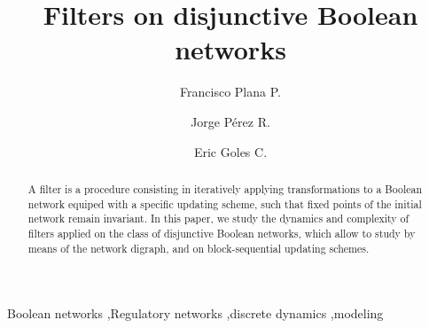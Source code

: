 \documentclass[preprint,12pt]{elsarticle}
\begin{document}
\begin{frontmatter}



\title{Filters on disjunctive Boolean networks}


\author{Francisco Plana P.}
\author[UCh]{Jorge Pérez R.}
\author[UAI]{Eric Goles C.}


\address[UAI]{Universidad Adolfo Ibáñez}
\address[UCh]{Universidad de Chile}

\begin{abstract}
A filter is a procedure consisting in iteratively applying transformations to a Boolean network equiped with a specific updating scheme, such that fixed points of the initial network remain invariant. In this paper, we study the dynamics and complexity of filters applied on the class of disjunctive Boolean networks, which allow to study by means of the network digraph, and on block-sequential updating schemes.
\end{abstract}

\begin{keyword}
Boolean networks \sep Regulatory networks \sep discrete dynamics \sep modeling 


\end{keyword}

\end{frontmatter}
\end{document}
